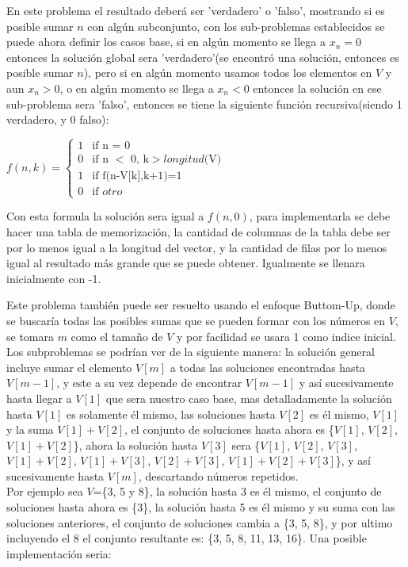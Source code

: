 \documentclass[12pt, a4paper]{article}
\newcommand\cppfile[2][]{

}
\begin{document}
	En este problema el resultado deberá ser 'verdadero' o 'falso', mostrando si es posible sumar $n$ con algún 
	subconjunto, con los sub-problemas establecidos se puede ahora definir los casos base, si en algún momento 
	se llega a $x_{n}=0$ entonces la solución global sera 'verdadero'(se encontró una solución, entonces es posible 
	sumar $n$), pero si en algún momento usamos todos los elementos en $V$ y aun $x_{n}>0$, o 
	en algún momento se llega a $x_{n}<0$ entonces la solución en ese sub-problema sera 'falso', entonces se tiene la
	siguiente función recursiva(siendo 1 verdadero, y 0 falso):
	\begin{center}
		$f(n, k) = 	
		\begin{cases}
			1 & \text{if n = 0}\\
			0 & \text{if n $<$ 0, k$>longitud( $V$)$}\\
			1 & \text{if f(n-V[k],k+1)=1}\\
			0 & \text{if $otro$}
		\end{cases}
	$\\
	\end{center}
	Con esta formula la solución sera igual a $f(n,0)$, para implementarla se debe hacer una tabla de memorización,
	la cantidad de columnas de la tabla debe ser por lo menos igual a la longitud del vector, y la cantidad 
	de filas por lo menos igual al resultado más grande que se puede obtener. Igualmente se llenara inicialmente con -1.
	\cppfile[24-33]{Programacion_dinamica/codigos/SubSetSum.cpp}
	
	Este problema también puede ser resuelto usando el enfoque Buttom-Up, donde se buscaría todas las posibles 
	sumas que se pueden formar con los números en $V$, se tomara $m$ como el tamaño de $V$ y por facilidad se usara 1 
	como indice inicial. Los subproblemas se podrían ver de la siguiente manera: la solución general incluye sumar el
	elemento $V[m]$ a todas las soluciones encontradas hasta $V[m-1]$, y este a su vez depende de encontrar $V[m-1]$
	y así sucesivamente hasta llegar a $V[1]$ que sera nuestro caso base, mas detalladamente la solución hasta $V[1]$ 
	es solamente él mismo, las soluciones hasta $V[2]$ es él mismo, $V[1]$ y la suma $V[1]+V[2]$, el conjunto de
	soluciones hasta ahora es \{$V[1]$, $V[2]$, $V[1]+V[2]$\}, ahora la solución hasta $V[3]$ sera 
	\{$V[1]$, $V[2]$, $V[3]$, $V[1]+V[2]$, $V[1]+V[3]$, $V[2]+V[3]$, $V[1]+V[2]+V[3]$\}, y así sucesivamente hasta 
	$V[m]$, descartando números repetidos.\\
	
	Por ejemplo sea $V$=\{3, 5 y 8\}, la solución hasta 3 es él mismo, el conjunto de soluciones hasta ahora es \{3\},
	la solución hasta 5 es él mismo y su suma con las soluciones anteriores, el conjunto de soluciones cambia a 
	\{3, 5, 8\}, y por ultimo incluyendo el 8 el conjunto resultante es: \{3, 5, 8, 11, 13, 16\}. Una posible
	implementación seria:\\
	\cppfile[8-21]{Programacion_dinamica/codigos/SubSetSum.cpp}
	
\end{document}
